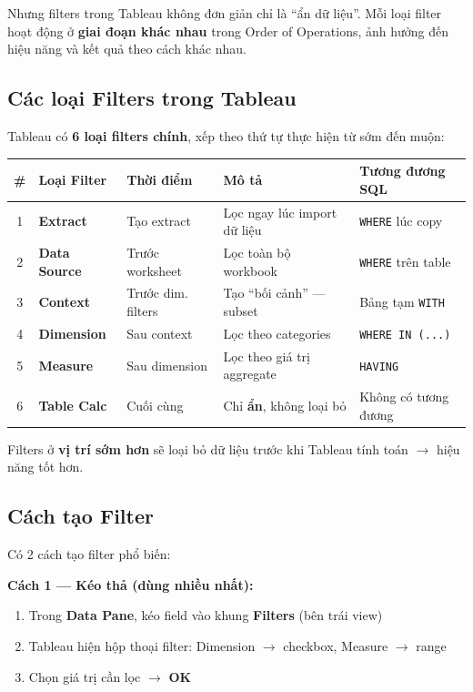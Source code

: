 \documentclass[12pt]{article}
\begin{document}
\noindent Nhưng filters trong Tableau không đơn giản chỉ là ``ẩn dữ liệu''. Mỗi loại filter hoạt động ở \textbf{giai đoạn khác nhau} trong Order of Operations, ảnh hưởng đến hiệu năng và kết quả theo cách khác nhau.

\subsection{Các loại Filters trong Tableau}

\noindent Tableau có \textbf{6 loại filters chính}, xếp theo thứ tự thực hiện từ sớm đến muộn:

\begin{center}
\renewcommand{\arraystretch}{1.4}
\small
\begin{tabularx}{\linewidth}{c l l X X}
\toprule
\textbf{\#} & \textbf{Loại Filter} & \textbf{Thời điểm} & \textbf{Mô tả} & \textbf{Tương đương SQL} \\
\midrule
1 & \textbf{Extract} & Tạo extract & Lọc ngay lúc import dữ liệu & \texttt{WHERE} lúc copy \\
2 & \textbf{Data Source} & Trước worksheet & Lọc toàn bộ workbook & \texttt{WHERE} trên table \\
3 & \textbf{Context} & Trước dim. filters & Tạo ``bối cảnh'' --- subset & Bảng tạm \texttt{WITH} \\
4 & \textbf{Dimension} & Sau context & Lọc theo categories & \texttt{WHERE IN (...)} \\
5 & \textbf{Measure} & Sau dimension & Lọc theo giá trị aggregate & \texttt{HAVING} \\
6 & \textbf{Table Calc} & Cuối cùng & Chỉ \textbf{ẩn}, không loại bỏ & Không có tương đương \\
\bottomrule
\end{tabularx}
\end{center}

\noindent Filters ở \textbf{vị trí sớm hơn} sẽ loại bỏ dữ liệu trước khi Tableau tính toán $\rightarrow$ hiệu năng tốt hơn.

\subsection{Cách tạo Filter}

\noindent Có 2 cách tạo filter phổ biến:

\noindent \textbf{Cách 1 --- Kéo thả (dùng nhiều nhất):}

\begin{enumerate}[nosep]
    \item Trong \textbf{Data Pane}, kéo field vào khung \textbf{Filters} (bên trái view)
    \item Tableau hiện hộp thoại filter: Dimension $\rightarrow$ checkbox, Measure $\rightarrow$ range
    \item Chọn giá trị cần lọc $\rightarrow$ \textbf{OK}
\end{enumerate}
\end{document}
